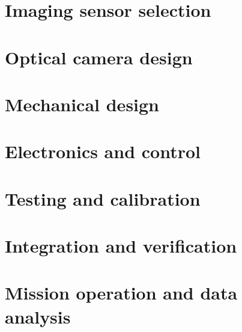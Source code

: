 \documentclass[]{article}
\begin{document}
\section{Imaging sensor selection}
\section{Optical camera design}
\section{Mechanical design}
\section{Electronics and control}
\section{Testing and calibration}
\section{Integration and verification}
\section{Mission operation and data analysis}
\end{document}
